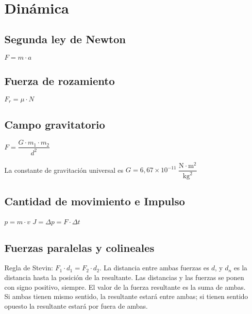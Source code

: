 \section{Dinámica}
    
\subsection*{Segunda ley de Newton}

\hfil$F=m\cdot a$\hfil


\subsection*{Fuerza de rozamiento}

\hfil$F_r = {\mu} \cdot N$\hfil


\subsection*{Campo gravitatorio}

\hfil$F = \dfrac{G\cdot m_1 \cdot m_2}{d^2}$\hfil

La constante de gravitación universal es $G = 6,67\times 10^{-11}\;\dfrac{\text{N}\cdot \text{m}^2}{\text{kg}^2}$


\subsection*{Cantidad de movimiento e Impulso}

\hfil
$p = m\cdot v$
\hfil
$J=\Delta p = F \cdot \Delta t$
\hfil

\subsection*{Fuerzas paralelas y colineales}

Regla de Stevin: $F_1 \cdot d_1 = F_2 \cdot d_2$. La distancia entre ambas fuerzas es $d$, y $d_n$ es la distancia hasta la posición de la resultante. Las distancias y las fuerzas se ponen con signo positivo, siempre. El valor de la fuerza resultante es la suma de ambas. Si ambas tienen mismo sentido, la resultante estará entre ambas; si tienen sentido opuesto la resultante estará por fuera de ambas.